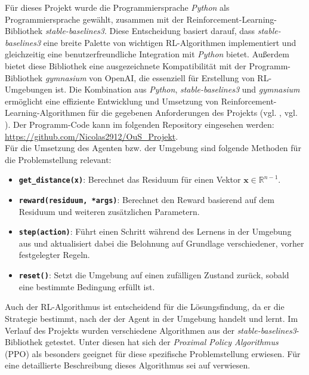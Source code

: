 \documentclass{article}
\def\code#1{\texttt{#1}}
\theoremstyle{newline}
\begin{document}
\begin{onehalfspace}
Für dieses Projekt wurde die Programmiersprache \textit{Python} als Programmiersprache gewählt, zusammen mit der Reinforcement-Learning-Bibliothek \textit{stable-baselines3}. Diese Entscheidung basiert darauf, dass \textit{stable-baselines3} eine breite Palette von wichtigen RL-Algorithmen implementiert und gleichzeitig eine benutzerfreundliche Integration mit \textit{Python} bietet. Außerdem bietet diese Bibliothek eine ausgezeichnete Kompatibilität mit der Programm-Bibliothek \textit{gymnasium} von OpenAI, die essenziell für Erstellung von RL-Umgebungen ist. Die Kombination aus \textit{Python}, \textit{stable-baselines3} und \textit{gymnasium} ermöglicht eine effiziente Entwicklung und Umsetzung von Reinforcement-Learning-Algorithmen für die gegebenen Anforderungen des Projekts (vgl. \cite{Raffin2021}, vgl. \cite{Towers2023}). Der Programm-Code kann im folgenden Repository eingesehen werden: \url{https://github.com/Nicolas2912/OuS_Projekt}.
\\

Für die Umsetzung des Agenten bzw. der Umgebung sind folgende Methoden für die Problemstellung relevant:

\begin{itemize}
	\item \textbf{\code{get\_distance(x)}}: Berechnet das Residuum für einen Vektor $\mathbf{x} \in \mathbb{R}^{n-1}$.
	\item \textbf{\code{reward(residuum, *args)}}: Berechnet den Reward basierend auf dem Residuum und weiteren zusätzlichen Parametern.
	\item \textbf{\code{step(action)}}: Führt einen Schritt während des Lernens in der Umgebung aus und aktualisiert dabei die Belohnung auf Grundlage verschiedener, vorher festgelegter Regeln.
	\item \textbf{\code{reset()}}: Setzt die Umgebung auf einen zufälligen Zustand zurück, sobald eine bestimmte Bedingung erfüllt ist.
\end{itemize}
\bigskip

Auch der RL-Algorithmus ist entscheidend für die Lösungsfindung, da er die Strategie bestimmt, nach der der Agent in der Umgebung handelt und lernt. Im Verlauf des Projekts wurden verschiedene Algorithmen aus der \textit{stable-baselines3}-Bibliothek getestet. Unter diesen hat sich der \textit{Proximal Policy Algorithmus} (PPO) als besonders geeignet für diese spezifische Problemstellung erwiesen. Für eine detaillierte Beschreibung dieses Algorithmus sei auf \cite{Schulman2017} verwiesen.
\medskip


\end{onehalfspace}
\end{document}
